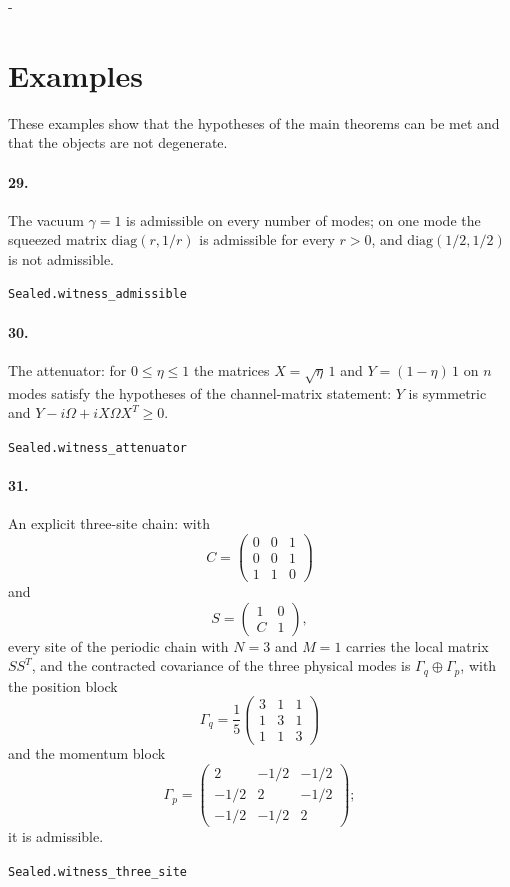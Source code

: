 \documentclass[11pt]{article}
\makeatletter
\newcommand{\keepspace}[1]{\par\penalty-100\begingroup\setlength{\dimen@}{#1}\dimen@ii\pagegoal\advance\dimen@ii-\pagetotal\ifdim\dimen@>\dimen@ii\ifdim\dimen@ii>\z@\vfil\fi\break\fi\endgroup}
\makeatother
\begin{document}
\keepspace{14\baselineskip}\section*{Examples}
These examples show that the hypotheses of the main theorems can be met and that the objects are not degenerate.

\paragraph{29.} The vacuum $\gamma = 1$ is admissible on every number of modes; on one mode the squeezed matrix $\mathrm{diag}(r, 1/r)$ is admissible for every $r > 0$, and $\mathrm{diag}(1/2, 1/2)$ is not admissible.\par{\footnotesize\texttt{Sealed.witness\_admissible}}

\paragraph{30.} The attenuator: for $0 \le \eta \le 1$ the matrices $X = \sqrt\eta\, 1$ and $Y = (1 - \eta)\, 1$ on $n$ modes satisfy the hypotheses of the channel-matrix statement: $Y$ is symmetric and $Y - i\Omega + iX\Omega X^T \ge 0$.\par{\footnotesize\texttt{Sealed.witness\_attenuator}}

\paragraph{31.} An explicit three-site chain: with \[C = \begin{pmatrix} 0 & 0 & 1 \\ 0 & 0 & 1 \\ 1 & 1 & 0 \end{pmatrix}\] and \[S = \begin{pmatrix} 1 & 0 \\ C & 1 \end{pmatrix},\] every site of the periodic chain with $N = 3$ and $M = 1$ carries the local matrix $S S^T$, and the contracted covariance of the three physical modes is $\Gamma_q \oplus \Gamma_p$, with the position block \[\Gamma_q = \frac15 \begin{pmatrix} 3 & 1 & 1 \\ 1 & 3 & 1 \\ 1 & 1 & 3 \end{pmatrix}\] and the momentum block \[\Gamma_p = \begin{pmatrix} 2 & -1/2 & -1/2 \\ -1/2 & 2 & -1/2 \\ -1/2 & -1/2 & 2 \end{pmatrix};\] it is admissible.\par{\footnotesize\texttt{Sealed.witness\_three\_site}}
\end{document}
